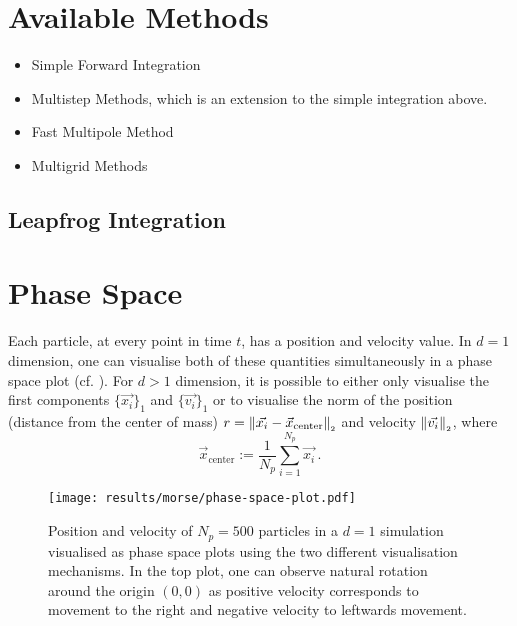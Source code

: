 \section{Available Methods}
\begin{itemize}
  \item Simple Forward Integration
  \item Multistep Methods, which is an extension to the simple integration above.
  \item Fast Multipole Method
  \item Multigrid Methods
\end{itemize}
\hierKoennteIhreWerbungStehen

\subsection{Leapfrog Integration}
\hierKoennteIhreWerbungStehen


\section{Phase Space}
Each particle, at every point in time $t$, has a position and velocity value.
In $d=1$ dimension, one can visualise both of these quantities simultaneously in a phase space plot (cf. ).
For $d > 1$ dimension, it is possible to either only visualise the first components $\{\vec{x_i}\}_1$ and $\{\vec{v_i}\}_1$ or to visualise the norm of the position (distance from the center of mass) $r = \left\lVert\vec{x_i} - \vec{x}_{\text{center}}\right\rVert_{\scriptscriptstyle 2}$ and velocity $\left\lVert\vec{v_i}\right\rVert_{\scriptscriptstyle 2}$, where $$\vec{x}_{\text{center}} := \frac{1}{N_p} \sum_{i=1}^{N_p} \vec{x_i}\,.$$

\begin{figure}[H]
  \centering
  \texttt{[image: results/morse/phase-space-plot.pdf]}
  \caption[Phase Space Plots]{Position and velocity of $N_p = 500$ particles in a $d=1$ simulation visualised as phase space plots using the two different visualisation mechanisms. In the top plot, one can observe natural rotation around the origin $(0, 0)$ as positive velocity corresponds to movement to the right and negative velocity to leftwards movement.}
  \label{fig:phase-space-plot}
\end{figure}

